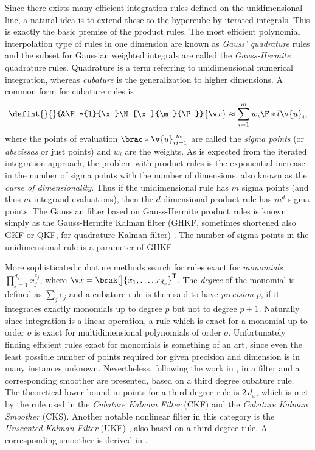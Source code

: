 Since there exists many efficient integration rules defined on the unidimensional line,
a natural idea is to extend these to the hypercube by iterated integrals. This is exactly the 
basic premise of the product rules. The most efficient polynomial interpolation type of rules
in one dimension are known as \emph{Gauss' quadrature} rules and the subset
for Gaussian weighted integrals are called the \emph{Gauss-Hermite}
quadrature rules. Quadrature is a term referring to unidimensional numerical integration, whereas
\emph{cubature} is the generalization to higher dimensions. A common form for cubature rules is
\begin{align}
	\defint{}{}{&\F*{l}{\x}\N[\x]{\m}{\P}}{\x} \approx \sum_{i=1}^m w_i\F*{l}{\v{u}_i},
\end{align}
where the points of evaluation $\brac*{\v{u}_i}_{i=1}^m$ are called the \emph{sigma points}
(or \emph{abscissas} or just points) and $w_i$ are the weights. As is expected from the iterated integration approach,
the problem with product rules is the exponential increase in the number of sigma points with
the number of dimensions, also known as the \emph{curse of dimensionality}. Thus if the unidimensional rule has $m$ sigma points (and thus $m$ integrand evaluations),
then the $d$ dimensional product rule has $m^d$ sigma points. The Gaussian filter based
on Gauss-Hermite product rules is known simply as the Gauss-Hermite Kalman filter (GHKF, sometimes shortened also GKF or QKF, for quadrature Kalman filter) \parencite{Ito2000}.
The number of sigma points in the unidimensional rule is a parameter of GHKF.

More sophisticated cubature methods search for rules
exact for \emph{monomials} $\prod_{j=1}^{d_x} x_j^{e_j}$, where $\x=\brak[\big]{x_1,\dots,x_{d_x}}^\tr$. 
The \emph{degree} of the monomial is defined as $\sum_j e_j$ and a cubature rule is then said to have
\emph{precision} $p$, if it integrates exactly monomials up to degree $p$ but not
to degree $p+1$. Naturally since integration is a linear operation, a rule which is exact 
for a monomial up to order $o$ is exact for multidimensional polynomials of order $o$.
Unfortunately finding efficient rules exact for monomials is something of an art, since
even the least possible number of points required for given precision and dimension is in many
instances unknown. Nevertheless, following the work in \textcite{Wu2006}, in \textcite{Arasaratnam2009,Arasaratnam2011} a filter
and a corresponding smoother are presented, based on a third degree 
cubature rule. The theoretical lower bound in points for a third degree rule
is $2\,d_x$, which is met by the rule used in the \emph{Cubature Kalman Filter} (CKF) and
the \emph{Cubature Kalman Smoother} (CKS). Another notable nonlinear filter in this
category is the \emph{Unscented Kalman Filter} (UKF) \parencite{julier1997new,Merwe2004}, 
also based on a third degree rule. A corresponding smoother is derived in \textcite{Sarkka2008a}.

